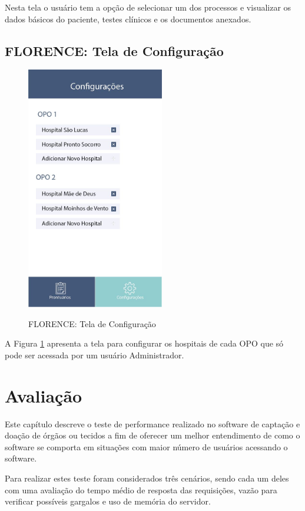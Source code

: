 \documentclass[portuguese,oneside]{tcc}
\begin{document}
Nesta tela o usuário tem a opção de selecionar um dos processos e visualizar os dados básicos do paciente, testes clínicos e os documentos anexados.

\section{FLORENCE: Tela de Configuração}

\begin{figure}[htp]
\centering
\caption{FLORENCE: Tela de Configuração}
\includegraphics[width=6cm]{app-config}
\label{fig:app-config}
\end{figure}

A Figura \ref{fig:app-config} apresenta a tela para configurar os hospitais de cada OPO que só pode ser acessada por um usuário Administrador. 

\chapter{Avaliação}
Este capítulo descreve o teste de performance realizado no software de captação e doação de órgãos ou tecidos a fim de oferecer um melhor entendimento de como o software se comporta em situações com maior número de usuários acessando o software.

Para realizar estes teste foram considerados três cenários, sendo cada um deles com uma avaliação do tempo médio de resposta das requisições, vazão para verificar possíveis gargalos e uso de memória do servidor.
\end{document}
